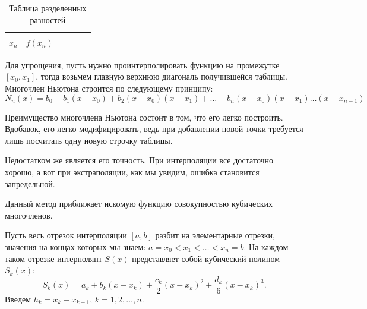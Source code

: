 \begin{table}[h!]
{\begin{tabular}{c|c|c|c|c|c|}
					\multicolumn{1}{|c|}{}         &                       &                                                                                                                                                        &                                                                                                                                          &                                                                                       &                            \\
					\multicolumn{1}{|c|}{$x_n$}    & $f(x_n)$              &                                                                                                                                                        &                                                                                                                                          &                                                                                       &       \\ \hline                    
				\end{tabular}%
			}
		\caption{Таблица разделенных разностей}
		\end{table}
	
		Для упрощения, пусть нужно проинтерполировать функцию на промежутке $[x_0, x_1]$, тогда возьмем главную верхнюю диагональ получившейся таблицы. Многочлен Ньютона строится по следующему принципу:
		\begin{equation*}
			N_n(x) = b_0 + b_1 (x-x_0) + b_2 (x-x_0)(x - x_1) + \ldots + b_n (x - x_0)(x - x_1) \ldots (x - x_{n-1})
		\end{equation*}
	
		Преимущество многочлена Ньютона состоит в том, что его легко построить. Вдобавок, его легко модифицировать, ведь при добавлении новой точки требуется лишь посчитать одну новую строчку таблицы.
		
		Недостатком же является его точность. При интерполяции все достаточно хорошо, а вот при экстраполяции, как мы увидим, ошибка становится запредельной. 
		
		
		Данный метод приближает искомую функцию совокупностью кубических многочленов.
		
		Пусть весь отрезок интерполяции $[a, b]$ разбит на элементарные отрезки, значения на концах которых мы знаем: $a = x_0 < x_1 < \ldots < x_n = b$. На каждом таком отрезке интерполянт $S(x)$ представляет собой кубический полином $S_k(x)$:
		\begin{equation*}
			S_k(x) = a_k + b_k (x - x_k) + \frac{c_k}{2}(x - x_k)^2 + \frac{d_k}{6}(x - x_k)^3.
		\end{equation*}
		Введем $h_k = x_k - x_{k-1}$, $k = 1, 2,\ldots, n$.
		
